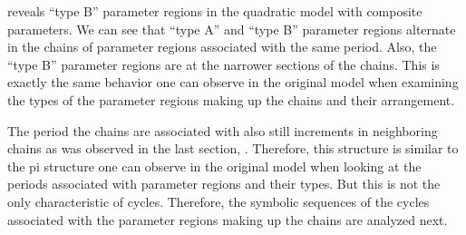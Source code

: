  reveals ``type B'' parameter regions in the quadratic model with composite parameters.
We can see that ``type A'' and ``type B'' parameter regions alternate in the chains of parameter regions associated with the same period.
Also, the ``type B'' parameter regions are at the narrower sections of the chains.
This is exactly the same behavior one can observe in the original model when examining the types of the parameter regions making up the chains and their arrangement.

The period the chains are associated with also still increments in neighboring chains as was observed in the last section, .
Therefore, this structure is similar to the \gls{pi} structure one can observe in the original model when looking at the periods associated with parameter regions and their types.
But this is not the only characteristic of cycles.
Therefore, the symbolic sequences of the cycles associated with the parameter regions making up the chains are analyzed next.


